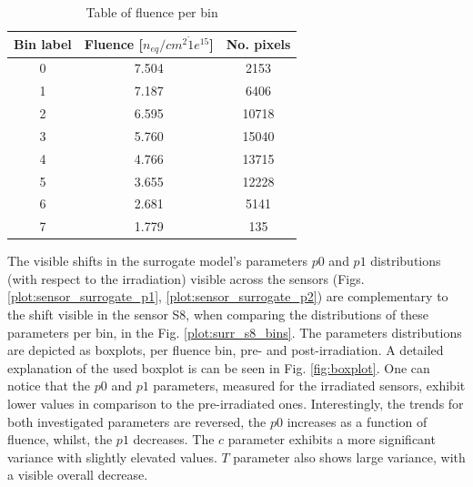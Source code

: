 \begin{table}[h]
\begin{center}
\begin{tabular}{ |c|c|c| }
\hline
Bin label & Fluence [$n_{eq}/cm^{2} \dot 1e^{15}$] & No. pixels \\
\hline
  0 & 7.504 & 2153  \\

\hline
  1 & 7.187 & 6406 \\

\hline
  2 & 6.595 & 10718 \\

\hline
  3 & 5.760 & 15040 \\
\hline
  4 & 4.766 & 13715 \\
\hline
  5 & 3.655 & 12228  \\
\hline
  6 & 2.681 & 5141   \\
\hline
  7 & 1.779 & 135\\
\hline
\end{tabular}
\caption{Table of fluence per bin}
\label{tab:fluence_per_bin}
\end{center}
\end{table}

The visible shifts in the surrogate model's parameters $p0$ and $p1$ distributions (with respect to the irradiation) visible across the sensors (Figs. \ref{plot:sensor_surrogate_p1}, \ref{plot:sensor_surrogate_p2}) are complementary to the shift visible in the sensor S8, when comparing the distributions of these parameters per bin, in the Fig. \ref{plot:surr_s8_bins}.
The parameters distributions are depicted as boxplots, per fluence bin, pre- and post-irradiation.
A detailed explanation of the used boxplot is can be seen in Fig. \ref{fig:boxplot}.
One can notice that the $p0$ and $p1$ parameters, measured for the irradiated sensors, exhibit lower values in comparison to the pre-irradiated ones.
Interestingly, the trends for both investigated parameters are reversed, the $p0$ increases as a function of fluence, whilst, the $p1$ decreases.
The $c$ parameter exhibits a more significant variance with slightly elevated values.
$T$ parameter also shows large variance, with a visible overall decrease.

